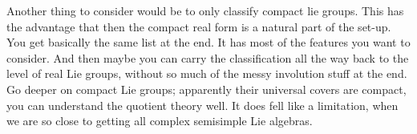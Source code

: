 \documentclass[twoside,11pt,a4paper,leqno]{article}
\numberwithin{equation}{section}
\theoremstyle{plain}
\theoremstyle{definition}
\begin{document}
Another thing to consider would be to only classify compact lie groups.
This has the advantage that then the compact real form is a natural part of the set-up.
You get basically the same list at the end.
It has most of the features you want to consider.
And then maybe you can carry the classification all the way back to the level of real Lie groups, without so much of the messy involution stuff at the end.
Go deeper on compact Lie groups; apparently their universal covers are compact, you can understand the quotient theory well.
It does fell like a limitation, when we are so close to getting all complex semisimple Lie algebras.

 

\end{document}
